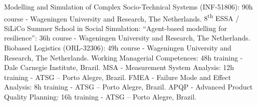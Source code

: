 \begin{scholarship}
					{Modelling and Simulation of Complex Socio-Technical Systems (INF-51806): 90h course - Wageningen University and Research, The Netherlands.}
	\scholarshipentry{}
					{8\textsuperscript{th} ESSA / SiLiCo Summer School in Social Simulation: “Agent-based modelling for resilience”: 36h course - Wageningen University and Research, The Netherlands.}
	\scholarshipentry{}
					{Biobased Logistics (ORL-32306): 49h course - Wageningen University and Research, The Netherlands.}
					{Working Managerial Competences: 48h training - Dale Carnegie Institute, Brazil.}
					{MSA - Measurement System Analysis: 12h training - ATSG – Porto Alegre, Brazil.}
	\scholarshipentry{}
					{FMEA - Failure Mode and Effect Analysis: 8h training - ATSG – Porto Alegre, Brazil.}
	\scholarshipentry{}
					{APQP - Advanced Product Quality Planning: 16h training - ATSG – Porto Alegre, Brazil.}
\end{scholarship}